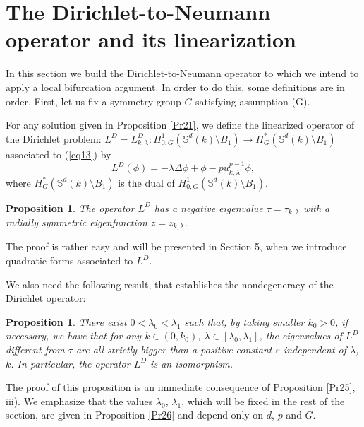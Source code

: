 \documentclass[reqno]{amsart}
\newtheorem{proposition}[theorem]{Proposition}
\def\e{\varepsilon}
\numberwithin{equation}{section}
\newenvironment{key words}{\textbf{Keywords}\mbox{  }}{ }
\begin{document}
\section{The Dirichlet-to-Neumann operator and its linearization}
\label{Section 4}

In this section we build the Dirichlet-to-Neumann operator to which we intend to apply a local bifurcation argument. In order to do this, some definitions are in order. First, let us fix a symmetry group $G$ satisfying assumption (G).

For any solution given in Proposition \ref{Pr21}, we define the linearized operator of the Dirichlet problem: $L^D=L_{k, \lambda}^D:H^{1}_{0,G}(\mathbb{S}^{d}(k)\setminus B_{1})\rightarrow H^{*}_G(\mathbb{S}^{d}(k)\setminus B_{1})$ associated to (\ref{eq13}) by
\begin{equation}\label{eq220}
	L^D(\phi)=-\lambda\Delta\phi+\phi-pu_{k, \lambda}^{p-1}\phi,
\end{equation}
where $H^{*}_G(\mathbb{S}^{d}(k)\setminus B_{1})$ is the dual of $H^{1}_{0,G}(\mathbb{S}^{d}(k)\setminus B_{1}).$

\medskip


\begin{proposition} \label{index} The operator $L^D$ has a negative eigenvalue $\tau=\tau_{k, \lambda}$ with a radially symmetric eigenfunction $z= z_{k, \lambda}$. \end{proposition}

The proof is rather easy and will be presented in Section 5, when we introduce quadratic forms associated to $L^D$.


\medskip We also need the following result, that establishes the nondegeneracy of the Dirichlet operator:

\begin{proposition} \label{nondeg D} There exist $0< \lambda_0 < \lambda_1$ such that, by taking smaller $k_0 >0$, if necessary, we have that for any $k \in (0, k_0)$, $\lambda \in [\lambda_0, \lambda_1]$, the eigenvalues of $L^D$ different from $\tau$ are all strictly bigger than a positive constant $\e$ independent of $\lambda$, $k$. In particular, the operator $L^D$ is an isomorphism.
	
\end{proposition}

The proof of this proposition is an immediate consequence of Proposition \ref{Pr25}, iii). We emphasize that the values $\lambda_0$, $\lambda_1$, which will be fixed in the rest of the section, are given in Proposition \ref{Pr26} and depend only on $d$, $p$ and $G$.
\end{document}
